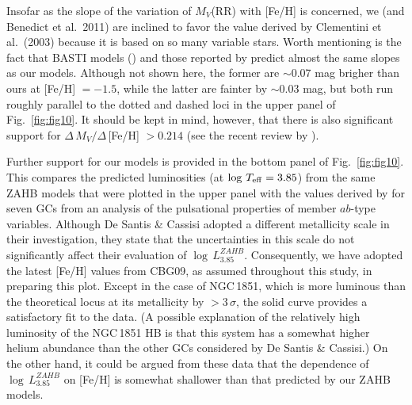 \documentclass[12pt,preprint]{aastex}
\newcommand\teff{{T_{\rm eff}}}
\begin{document}
Insofar as the slope of the variation of $M_V$(RR) with [Fe/H] is concerned,
we (and Benedict et al.~2011) are inclined to favor the value derived by
Clementini et al.~(2003) because it is based on so many variable stars.  Worth
mentioning is the fact that BASTI models (\citealt{pcs06}) and those reported
by \citet{cps04} predict almost the same slopes as our models.  Although not
shown here, the former are $\sim 0.07$ mag brigher than ours at [Fe/H] $= -1.5$,
while the latter are fainter by $\sim 0.03$ mag, but both run roughly parallel
to the dotted and dashed loci in the upper panel of Fig.~\ref{fig:fig10}.  It
should be kept in mind, however, that there is also significant support for 
$\Delta\,M_V/\Delta\,$[Fe/H] $> 0.214$ (see the recent review by
\citealt{cac13}).  

Further support for our models is provided in the bottom panel of
Fig.~\ref{fig:fig10}.  This compares the predicted luminosities (at $\log\,\teff
= 3.85$) from the same ZAHB models that were plotted in the upper panel with the
values derived by \citet{dsc99} for seven GCs from an analysis of the
pulsational properties of member $ab$-type variables.  Although De Santis \&
Cassisi adopted a different metallicity scale in their investigation, they state 
that the uncertainties in this scale do not significantly affect their 
evaluation of $\log\,L_{3.85}^{ZAHB}$.  Consequently, we have adopted the latest
[Fe/H] values from CBG09, as assumed throughout this study, in preparing this
plot.  Except in the case of NGC$\,$1851, which is more luminous than the
theoretical locus at its metallicity by $> 3\,\sigma$, the solid curve provides
a satisfactory fit to the data.  (A possible explanation of the relatively high
luminosity of the NGC$\,$1851 HB is that this system has a somewhat higher
helium abundance than the other GCs considered by De Santis \& Cassisi.)  On
the other hand, it could be argued from these data that the dependence of
$\log\,L_{3.85}^{ZAHB}$ on [Fe/H] is somewhat shallower than that predicted by
our ZAHB models.
\end{document}
